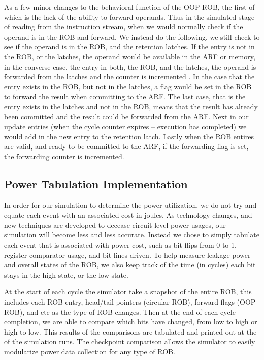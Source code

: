 As a few minor changes to the behavioral function of the OOP ROB, the first of which is the lack of the ability to forward operands.  Thus in the simulated stage of reading from the instruction stream, when we would normally check if the operand is in the ROB and forward.  We instead do the following, we still check to see if the operand is in the ROB, and the retention latches. If the entry is not in the ROB, or the latches, the operand would be available in the ARF or memory, in the converse case,  the entry in both, the ROB, and the latches, the operand is forwarded from the latches and the counter is incremented .  In the case that the entry exists in the ROB, but not in the latches, a flag would be set in the ROB to forward the result when committing to the ARF. The last case, that is the entry exists in the latches and not in the ROB, means that the result has already been committed and the result could be forwarded from the ARF.  Next in our update entries (when the cycle counter expires -- execution has completed) we would add in the new entry to the retention latch.  Lastly when the ROB entires are valid, and ready to be committed to the ARF,
if the forwarding flag is set, the forwarding counter is incremented.

\subsection{Power Tabulation Implementation}
In order for our simulation to determine the power utilization, we do not try and equate each event with an associated cost in joules.  As technology changes, and new techniques are developed to decease circuit level power usages, our simulation will become less and less accurate.  Instead we chose to simply tabulate each event that is associated with power cost, such as bit flips from 0 to 1, register comparator usage, and bit lines driven.  To help measure leakage power and overall states of the ROB, we also keep track of the time (in cycles) each bit stays in the high state, or the low state.

At the start of each cycle the simulator take a snapshot of the entire ROB, this includes each ROB entry, head/tail pointers (circular ROB), forward flags (OOP ROB), and etc as the type of ROB changes.  Then at the end of each cycle completion, we are able to compare which bits have changed, from low to high or high to low.   This results of the comparisons are tabulated
and printed out at the of the simulation runs.  The checkpoint comparison allows the simulator to easily modularize power data collection for any type of ROB.

